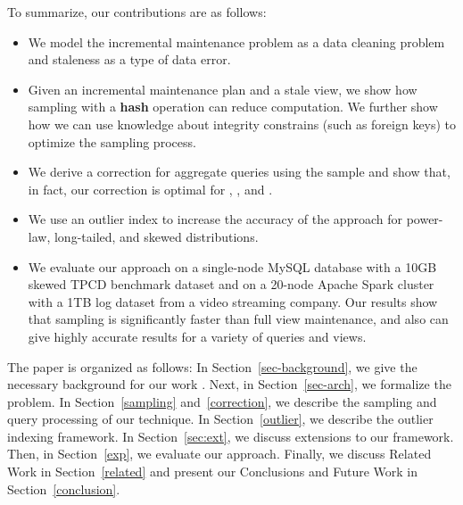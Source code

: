 To summarize, our contributions are as follows:
\begin{itemize}\vspace{-.45em}
\item We model the incremental maintenance problem as a data cleaning problem and staleness as a type of data error.\vspace{-.45em}
\item Given an incremental maintenance plan and a stale view, we show how sampling with a \textbf{hash} operation can reduce computation. We further show how we can use knowledge about integrity constrains (such as foreign keys) to optimize the sampling process. \vspace{-.45em}
\item We derive a correction for aggregate queries using the sample and show that, in fact, our correction is optimal for \sumfunc, \countfunc, and \avgfunc. \vspace{-.45em}
\item We use an outlier index to increase the accuracy of the approach for power-law, long-tailed, and skewed distributions.\vspace{-.45em}
\item We evaluate our approach on a single-node MySQL database with a 10GB skewed TPCD benchmark dataset and on a 20-node Apache Spark cluster with a 1TB log dataset from a video streaming company. Our results show that sampling is significantly faster than full view maintenance, and also can give highly accurate results for a variety of queries and views.\vspace{-.45em}
\end{itemize}

The paper is organized as follows: 
In Section~\ref{sec-background}, we give the necessary background for our work .
Next, in Section~\ref{sec-arch}, we formalize the problem.
In Section~\ref{sampling} and~\ref{correction}, we describe the sampling and query processing of our technique.
In Section~\ref{outlier}, we describe the outlier indexing framework.
In Section~\ref{sec:ext}, we discuss extensions to our framework.
Then, in Section~\ref{exp}, we evaluate our approach.
Finally, we discuss Related Work in Section~\ref{related} and present our Conclusions and Future Work in Section~\ref{conclusion}.
